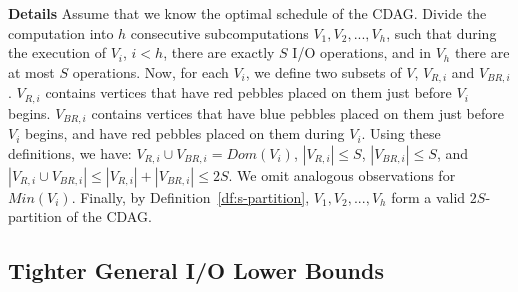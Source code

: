 \documentclass[sigplan,review,anonymous]{acmart}\settopmatter{printfolios=true,printccs=false,printacmref=false}
\newcommand\greg[1]{\textcolor{blue}{[Greg: #1]}}
\newcommand{\macb}[1]{\textbf{\textsf{#1}}}
\begin{document}
\macb{Details}
%
%
Assume that we know the optimal schedule of the CDAG. Divide the computation
into $h$ consecutive subcomputations $V_1, V_2, ..., V_h$, such that during the
execution of $V_i$, $i < h$, there are exactly $S$ I/O operations, and in $V_h$
there are at most $S$ operations. Now, for each $V_i$, we define two subsets of
$V$, $V_{R,i}$ and $V_{BR,i}$.
%
%
$V_{R,i}$ contains vertices that have red pebbles placed on them just before
$V_i$ begins.
%
$V_{BR,i}$ contains vertices that have blue pebbles placed on them just before
$V_i$ begins, and have red pebbles placed on them during $V_i$.
%
%
%
%
Using these definitions, we have:  $V_{R,i} \cup V_{BR,i} =
Dom(V_i)$,  $|V_{R,i}| \le S$,  $|V_{BR,i}| \le S$, and
 $|V_{R,i} \cup V_{BR,i}| \le |V_{R,i}| + |V_{BR,i}| \le 2S$.
% 
% 
We omit analogous observations for $Min(V_i)$. 
%
Finally, by Definition~\ref{df:s-partition}, $V_1, V_2, ..., V_h$ form a valid
$2S$-partition of the CDAG. 




\subsection{Tighter General I/O Lower Bounds}
\label{sec:seq-proof}

%
\end{document}
